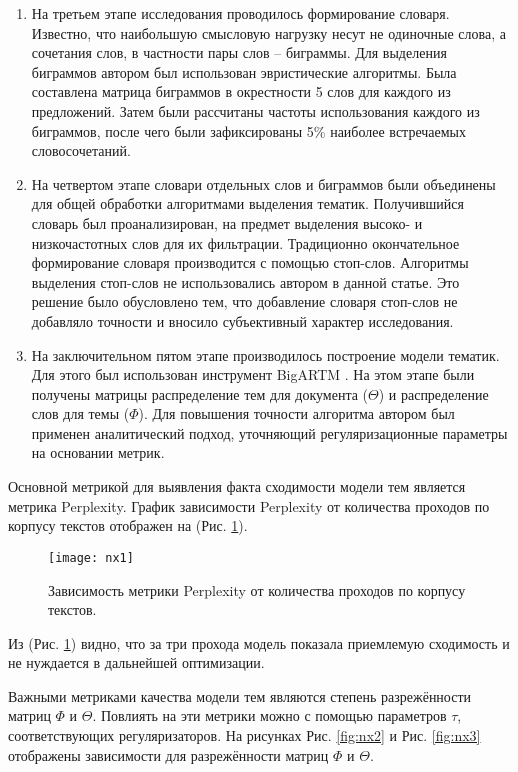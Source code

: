 \begin{enumerate}
\item 
На третьем этапе исследования проводилось формирование словаря. 
Известно, что наибольшую смысловую нагрузку несут не одиночные слова, а сочетания слов, в частности пары слов – биграммы. 
Для выделения биграммов автором был использован эвристические алгоритмы. 
Была составлена матрица биграммов в окрестности 5 слов для каждого из предложений. 
Затем были рассчитаны частоты использования каждого из биграммов, после чего были зафиксированы 5\% наиболее встречаемых словосочетаний.

\item 
На четвертом этапе словари отдельных слов и биграммов были объединены для общей обработки алгоритмами выделения тематик. 
Получившийся словарь был проанализирован, на предмет выделения высоко- и низкочастотных слов для их фильтрации. 
Традиционно окончательное формирование словаря производится с помощью стоп-слов. 
Алгоритмы выделения стоп-слов не использовались автором в данной статье. 
Это решение было обусловлено тем, что добавление словаря стоп-слов не добавляло точности и вносило субъективный характер исследования.

\item 
На заключительном пятом этапе производилось построение модели тематик. 
Для этого был использован инструмент BigARTM \cite{ianina2017multi}. 
На этом этапе были получены матрицы распределение тем для документа ($\Theta$) и распределение слов для темы ($\Phi$). 
Для повышения точности алгоритма автором был применен аналитический подход, уточняющий регуляризационные параметры на основании метрик. 
\end{enumerate}

Основной метрикой для выявления факта сходимости модели тем является метрика Perplexity. 
График зависимости Perplexity от количества проходов по корпусу текстов отображен на (Рис. \ref{fig:nx1}).
\begin{figure}[H]
  \caption{Зависимость метрики Perplexity от количества проходов по корпусу текстов.}
  \centering
    \texttt{[image: nx1]}
  \label{fig:nx1}
\end{figure}  

Из (Рис. \ref{fig:nx1}) видно, что за три прохода модель показала приемлемую сходимость и не нуждается в дальнейшей оптимизации. 

Важными метриками качества модели тем являются степень разрежённости матриц $\Phi$ и $\Theta$. Повлиять на эти метрики можно с помощью параметров $\tau$, соответствующих регуляризаторов. На рисунках Рис. \ref{fig:nx2}  и Рис. \ref{fig:nx3} отображены зависимости для разрежённости матриц  $\Phi$ и $\Theta$.


